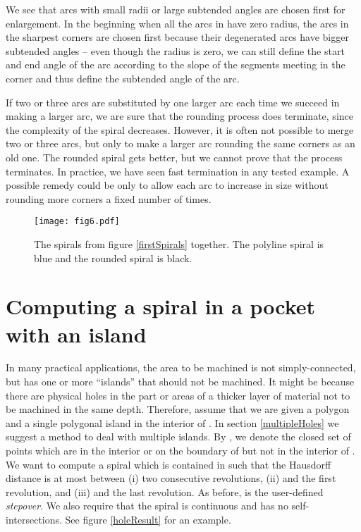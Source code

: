 \documentclass[3p]{elsarticle}
\begin{document}
We see that arcs with small radii or large subtended angles are chosen first for enlargement.
In the beginning when all the arcs in  have zero radius, the arcs in the sharpest corners are
chosen first because their degenerated arcs have bigger subtended angles -- even though the radius
is zero, we can still define the start and end angle of the arc according to the slope of the segments
meeting in the corner and thus define the subtended angle of the arc.

If two or three arcs are substituted by one larger arc each time we succeed in making a larger arc,
we are sure that
the rounding process does terminate, since the complexity of the spiral decreases.
However, it is often not possible to merge two or three arcs, but only to make a larger
arc rounding the same corners as an old one. The rounded spiral gets better, but we cannot
prove that the process terminates. In practice, we have seen fast termination in any tested example.
A possible remedy could be only to allow each arc to increase in size without rounding more corners
a fixed number of times.

\begin{figure*}
\centering
\texttt{[image: fig6.pdf]}
\label{spiralRounding}
\caption{The spirals from figure \ref{firstSpirals} together. The polyline spiral is blue and the rounded
spiral is black.}
\end{figure*}

\section{Computing a spiral in a pocket with an island}\label{pocketWithHole}

In many practical applications, the area to be machined is not simply-connected,
but has one or more ``islands'' that should not be machined. It might be because there are
physical holes in the part or areas of a thicker layer of material not to be machined in the same depth.
Therefore, assume that we are
given a polygon  and a single polygonal island  in the interior of . In
section \ref{multipleHoles} we suggest a method to deal with multiple islands.
By , we denote the closed set of points which are in the interior or
on the boundary of  but not in the interior of .
We want to compute a spiral which
is contained in  such that the Hausdorff distance is at most
 between (i) two consecutive revolutions,
(ii)  and the first revolution, and (iii)  and the last revolution.
As before,  is the user-defined \emph{stepover}.
We also require
that the spiral is  continuous and
has no self-intersections. See figure \ref{holeResult} for an example.
\end{document}
